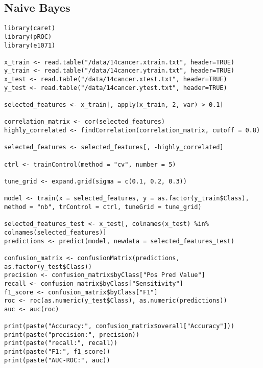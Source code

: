 \documentclass{article}
\begin{document}
\subsection{Naive Bayes}
\begin{lstlisting}
library(caret)
library(pROC)
library(e1071)

x_train <- read.table("/data/14cancer.xtrain.txt", header=TRUE)
y_train <- read.table("/data/14cancer.ytrain.txt", header=TRUE)
x_test <- read.table("/data/14cancer.xtest.txt", header=TRUE)
y_test <- read.table("/data/14cancer.ytest.txt", header=TRUE)

selected_features <- x_train[, apply(x_train, 2, var) > 0.1]

correlation_matrix <- cor(selected_features)
highly_correlated <- findCorrelation(correlation_matrix, cutoff = 0.8)

selected_features <- selected_features[, -highly_correlated]

ctrl <- trainControl(method = "cv", number = 5)

tune_grid <- expand.grid(sigma = c(0.1, 0.2, 0.3))

model <- train(x = selected_features, y = as.factor(y_train$Class), method = "nb", trControl = ctrl, tuneGrid = tune_grid)

selected_features_test <- x_test[, colnames(x_test) %in% colnames(selected_features)]
predictions <- predict(model, newdata = selected_features_test)

confusion_matrix <- confusionMatrix(predictions, as.factor(y_test$Class))
precision <- confusion_matrix$byClass["Pos Pred Value"]
recall <- confusion_matrix$byClass["Sensitivity"]
f1_score <- confusion_matrix$byClass["F1"]
roc <- roc(as.numeric(y_test$Class), as.numeric(predictions))
auc <- auc(roc)

print(paste("Accuracy:", confusion_matrix$overall["Accuracy"]))
print(paste("precision:", precision))
print(paste("recall:", recall))
print(paste("F1:", f1_score))
print(paste("AUC-ROC:", auc))
\end{lstlisting}
\newpage
\end{document}
